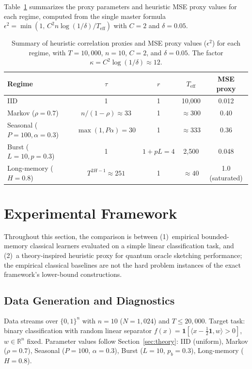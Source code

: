 \documentclass[sensors,article,submit,pdftex,moreauthors]{Definitions/mdpi}
\newcommand{\R}{\mathbb{R}}
\newcommand{\Teff}{T_{\mathrm{eff}}}
\begin{document}
Table~\ref{tab:bounds} summarizes the proxy parameters and heuristic MSE proxy values for each regime, computed from the single master formula $\epsilon^2 = \min(1,\, C^2 n \log(1/\delta) / \Teff)$ with $C = 2$ and $\delta = 0.05$.

\begin{table}[t]
\centering
\caption{Summary of heuristic correlation proxies and MSE proxy values ($\epsilon^2$) for each regime, with $T = 10{,}000$, $n = 10$, $C = 2$, and $\delta = 0.05$. The factor $\kappa = C^2 \log(1/\delta) \approx 12$.}
\label{tab:bounds}
\begin{tabular}{@{}lcccc@{}}
\toprule
Regime & $\tau$ & $r$ & $\Teff$ & MSE proxy \\
\midrule
IID & 1 & 1 & 10{,}000 & 0.012 \\
Markov ($\rho{=}0.7$) & $n/(1{-}\rho) \approx 33$ & 1 & $\approx 300$ & 0.40 \\
Seasonal ($P{=}100, \alpha{=}0.3$) & $\max(1, P\alpha) = 30$ & 1 & $\approx 333$ & 0.36 \\
Burst ($L{=}10, p{=}0.3$) & 1 & $1{+}pL = 4$ & 2{,}500 & 0.048 \\
Long-memory ($H{=}0.8$) & $T^{2H{-}1} \approx 251$ & 1 & $\approx 40$ & 1.0 (saturated) \\
\bottomrule
\end{tabular}

\end{table}


\section{Experimental Framework}
\label{sec:experiments}

Throughout this section, the comparison is between (1)~empirical bounded-memory classical learners evaluated on a simple linear classification task, and (2)~a theory-inspired heuristic proxy for quantum oracle sketching performance; the empirical classical baselines are not the hard problem instances of the exact framework's lower-bound constructions.

\subsection{Data Generation and Diagnostics}

Data streams over $\{0,1\}^n$ with $n = 10$ ($N = 1{,}024$) and $T \leq 20{,}000$. Target task: binary classification with random linear separator $f(x) = \mathbf{1}[\langle x - \tfrac{1}{2}\mathbf{1}, w \rangle > 0]$, $w \in \R^n$ fixed. Parameter values follow Section~\ref{sec:theory}: IID (uniform), Markov ($\rho = 0.7$), Seasonal ($P = 100$, $\alpha = 0.3$), Burst ($L = 10$, $p_b = 0.3$), Long-memory ($H = 0.8$).
\end{document}

